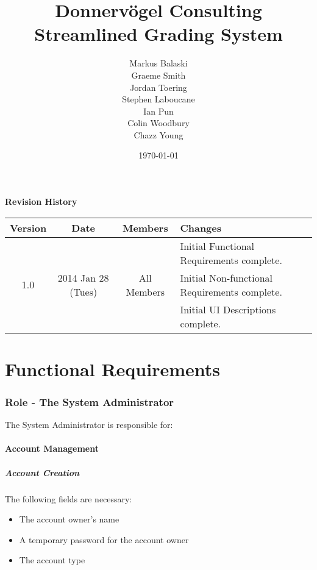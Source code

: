 \documentclass{article}
\begin{document}
\title{Donnervögel Consulting \\ Streamlined Grading System}
\author{Markus Balaski \\ Graeme Smith \\ Jordan Toering \\ Stephen Laboucane \\ Ian Pun \\ Colin Woodbury \\ Chazz Young}
\date{\today}
\maketitle
\clearpage

\textbf{Revision History}
\begin{center}
  \begin{tabular}{| c | c | c | l |}
    \hline
    Version & Date & Members & Changes\\
    \hline
    & & & Initial Functional Requirements complete.\\
    1.0 & 2014 Jan 28 (Tues) & All Members & Initial Non-functional Requirements complete.\\
    & & & Initial UI Descriptions complete.\\
    \hline
  \end{tabular}
\end{center}
\clearpage

\tableofcontents
\clearpage

\part{Functional Requirements}
\section{Role - The System Administrator \label{SysAdmin}}
The System Administrator is responsible for:
\subsection{Account Management}
\subsubsection{\label{Account Creation} Account Creation}
The following fields are necessary:
\begin{itemize}
  \item The account owner's name
  \item A temporary password for the account owner
  \item The account type
\end{itemize}
\end{document}
